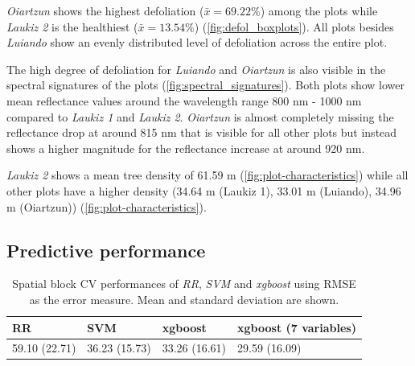 \documentclass[review]{elsarticle}
\begin{document}
\noindent \textit{Oiartzun} shows the highest defoliation ($\bar{x} = 69.22 \%$) among the plots while \textit{Laukiz 2} is the healthiest ($\bar{x} = 13.54 \%$) (\autoref{fig:defol_boxplots}).
All plots besides \textit{Luiando} show an evenly distributed level of defoliation across the entire plot.

\noindent The high degree of defoliation for \textit{Luiando} and \textit{Oiartzun} is also visible in the spectral signatures of the plots (\autoref{fig:spectral_signatures}).
Both plots show lower mean reflectance values around the wavelength range 800 nm - 1000 nm compared to \textit{Laukiz 1} and \textit{Laukiz 2}.
\textit{Oiartzun} is almost completely missing the reflectance drop at around 815 nm that is visible for all other plots but instead shows a higher magnitude for the reflectance increase at around 920 nm.

\noindent \textit{Laukiz 2} shows a mean tree density of 61.59 m (\autoref{fig:plot-characteristics}) while all other plots have a higher density (34.64 m (Laukiz 1), 33.01 m (Luiando), 34.96 m (Oiartzun)) (\autoref{fig:plot-characteristics}).

\subsection{Predictive performance}

\begin{table}[t!]
\centering
\caption[t]{Spatial block \ac{CV} performances of \textit{RR}, \textit{SVM} and \textit{xgboost} using \ac{RMSE} as the error measure.
	Mean and standard deviation are shown.}
\begingroup\footnotesize
\begin{tabular}{llll}
	RR            & SVM           & xgboost       & xgboost (7 variables) \\
	\hline
	59.10 (22.71) & 36.23 (15.73) & 33.26 (16.61) & 29.59   (16.09)       \\
	\bottomrule
\end{tabular}
\endgroup
\label{tab:model_comparison}
\end{table}
\end{document}
